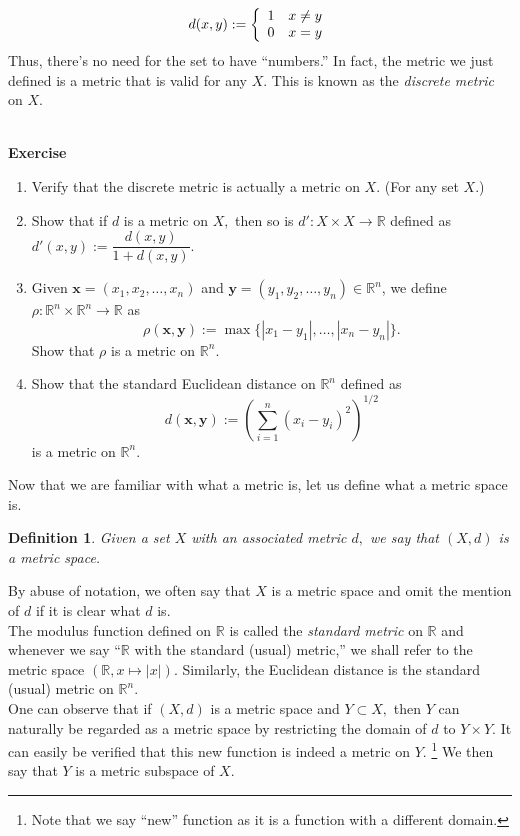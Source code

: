 \documentclass[12pt]{article}
\newtheorem{defn}{Definition}
\newcounter{exercise}
\newcommand{\exercise}{\refstepcounter{exercise}\par\medskip
   {\textbf{Exercise \theexercise }} \rmfamily}
\begin{document}
	\[d(x, y) := \left\{\begin{array}{c r}
		1 & x \neq y\\
		0 & x = y
	\end{array}
	\right.\]
	Thus, there's no need for the set to have ``numbers.'' In fact, the metric we just defined is a metric that is valid for any $X.$ This is known as the \emph{discrete metric} on $X.$\\~\\
	\exercise
	\begin{enumerate}[nosep]\label{ex:standard-metrics}
		\item Verify that the discrete metric is actually a metric on $X.$ (For any set $X.$)
		\item Show that if $d$ is a metric on $X,$ then so is $d' : X \times X \to \mathbb{R}$ defined as $d'(x, y) := \dfrac{d(x, y)}{1 + d(x, y)}.$
		\item Given $\textbf{x} = (x_1, x_2, \ldots, x_n)$ and $\textbf{y} = (y_1, y_2, \ldots, y_n) \in \mathbb{R}^n$, we define $\rho:\mathbb{R}^n\times \mathbb{R}^n \to \mathbb{R}$ as
		\[\rho(\textbf{x}, \textbf{y}) := \max\{|x_1 - y_1|, \ldots, |x_n - y_n|\}.\]
		Show that $\rho$ is a metric on $\mathbb{R}^n.$
		\item Show that the standard Euclidean distance on $\mathbb{R}^n$ defined as 
		\[d(\textbf{x}, \textbf{y}) := \left(\sum_{i=1}^{n}(x_i - y_i)^2\right)^{1/2}\]
		is a metric on $\mathbb{R}^n.$
	\end{enumerate}
	Now that we are familiar with what a metric is, let us define what a metric space is.
	\begin{defn}
		Given a set $X$ with an associated metric $d,$ we say that $(X, d)$ is a metric space.
	\end{defn}
	By abuse of notation, we often say that $X$ is a metric space and omit the mention of $d$ if it is clear what $d$ is.\\
	The modulus function defined on $\mathbb{R}$ is called the \emph{standard metric} on $\mathbb{R}$ and whenever we say ``$\mathbb{R}$ with the standard (usual) metric,'' we shall refer to the metric space $(\mathbb{R}, x \mapsto |x|).$ Similarly, the Euclidean distance is the standard (usual) metric on $\mathbb{R}^n.$\\
	One can observe that if $(X, d)$ is a metric space and $Y \subset X,$ then $Y$ can naturally be regarded as a metric space by restricting the domain of $d$ to $Y \times Y.$ It can easily be verified that this new function is indeed a metric on $Y.$ \footnote{Note that we say ``new'' function as it is a function with a different domain.} We then say that $Y$ is a metric subspace of $X.$
\end{document}
